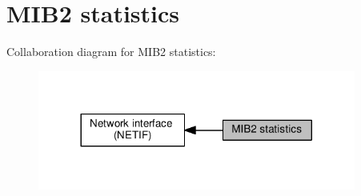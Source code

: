 \hypertarget{group__netif__mib2}{}\section{M\+I\+B2 statistics}
\label{group__netif__mib2}
Collaboration diagram for M\+I\+B2 statistics\+:
\nopagebreak
\begin{figure}[H]
\begin{center}
\leavevmode
\includegraphics[width=296pt]{group__netif__mib2}
\end{center}
\end{figure}
